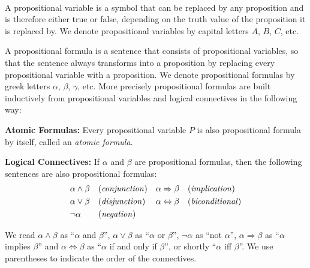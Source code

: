 \begin{definition}~\\
    A propositional variable is a symbol that can be replaced by any proposition and is therefore either true or false, depending on the truth value of the proposition it is replaced by. We denote propositional variables by capital letters $A$, $B$, $C$, etc.

    A propositional formula is a sentence that consists of propositional variables, so that the sentence always transforms into a proposition by replacing every propositional variable with a proposition. We denote propositional formulas by greek letters $\alpha$, $\beta$, $\gamma$, etc. More precisely propositional formulas are built inductively from propositional variables and logical connectives in the following way:

    \begin{definitionenumerate}
        \item \textbf{Atomic Formulas:} Every propositional variable $P$ is also propositional formula by itself, called an \emph{atomic formula}.
        \item \textbf{Logical Connectives:} If $\alpha$ and $\beta$ are propositional formulas, then the following sentences are also propositional formulas:
        \begin{align*}
            &\alpha \land \beta &&\text{(\emph{conjunction})}   &&\alpha \Rightarrow \beta &&\text{(\emph{implication})} \\
            &\alpha \lor \beta  &&\text{(\emph{disjunction})}   &&\alpha \Leftrightarrow \beta &&\text{(\emph{biconditional})} \\
            &\lnot\alpha        &&\text{(\emph{negation})}
        \end{align*}
    \end{definitionenumerate}
    We read $\alpha\land\beta$ as \enquote{$\alpha$ and $\beta$}, $\alpha\lor\beta$ as \enquote{$\alpha$ or $\beta$}, $\lnot\alpha$ as \enquote{not $\alpha$}, $\alpha\Rightarrow\beta$ as \enquote{$\alpha$ implies $\beta$} and $\alpha\Leftrightarrow\beta$ as \enquote{$\alpha$ if and only if $\beta$}, or shortly \enquote{$\alpha$ iff $\beta$}. We use parentheses to indicate the order of the connectives.
\end{definition}

